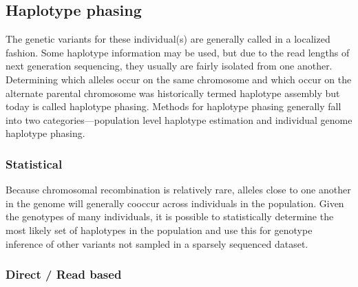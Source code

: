 \subsection{Haplotype phasing}\label{section:phasing}

\par{
The genetic variants for these individual(s) are generally called in a localized fashion. Some haplotype information may be used, but due to the read lengths of next generation sequencing, they usually are fairly isolated from one another. Determining which alleles occur on the same chromosome and which occur on the alternate parental chromosome was historically termed haplotype assembly but today is called haplotype phasing. Methods for haplotype phasing generally fall into two categories---population level haplotype estimation and individual genome haplotype phasing. 
}

\subsubsection{Statistical}

\par{
Because chromosomal recombination is relatively rare, alleles close to one another in the genome will generally cooccur across individuals in the population. Given the genotypes of many individuals, it is possible to statistically determine the most likely set of haplotypes in the population\cite{shapeit4} and use this for genotype inference of other variants not sampled in a sparsely sequenced dataset.
}

\subsubsection{Direct / Read based}

